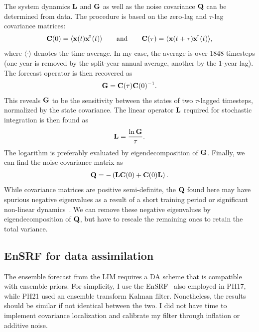 \documentclass[parskip=half,DIV=16]{scrartcl}
\begin{document}
The system dynamics $\vb{L}$ and $\vb{G}$ as well as the noise covariance $\vb{Q}$ can be determined from data. The procedure is based on the zero-lag and $\tau$-lag covariance matrices:
\begin{align*}
    \vb{C}(0) = \langle \vb{x}(t) \vb{x}^\transpose*(t) \rangle \qquad \mathrm{and} \qquad \vb{C}(\tau) = \langle \vb{x}(t+\tau) \vb{x}^\transpose*(t) \rangle,
\end{align*}
where $\langle \cdot \rangle$ denotes the time average. In my case, the average is over 1848 timesteps (one year is removed by the split-year annual average, another by the 1-year lag). The forecast operator is then recovered as
\begin{align*}
    \vb{G} = \vb{C}(\tau) \vb{C}(0)^{-1}.
\end{align*}
This reveals $\vb{G}$ to be the sensitivity between the states of two $\tau$-lagged timesteps, normalized by the state covariance. The linear operator $\vb{L}$ required for stochastic integration is then found as
\begin{align*}
    \vb{L} = \frac{\ln\vb{G}}{\tau}.
\end{align*}
The logarithm is preferably evaluated by eigendecomposition of $\vb{G}$. Finally, we can find the noise covariance matrix as
\begin{align}
    \label{eq:noise-cov}
    \vb{Q} = - \left( \vb{L} \vb{C}(0) + \vb{C}(0) \vb{L} \right).
\end{align}
While covariance matrices are positive semi-definite, the $\vb{Q}$ found here may have spurious negative eigenvalues as a result of a short training period or significant non-linear dynamics~\parencite{Penland1994}. We can remove these negative eigenvalues by eigendecomposition of $\vb{Q}$, but have to rescale the remaining ones to retain the total variance.



\subsection{EnSRF for data assimilation}
\label{subsec:setup-ensrf}

The ensemble forecast from the \gls{LIM} requires a \gls{DA} scheme that is compatible with ensemble priors. For simplicity, I use the \gls{EnSRF}~\parencite{Whitaker2002} also employed in PH17, while PH21 used an ensemble transform Kalman filter. Nonetheless, the results should be similar if not identical between the two. I did not have time to implement covariance localization and calibrate my filter through inflation or additive noise.
\end{document}
